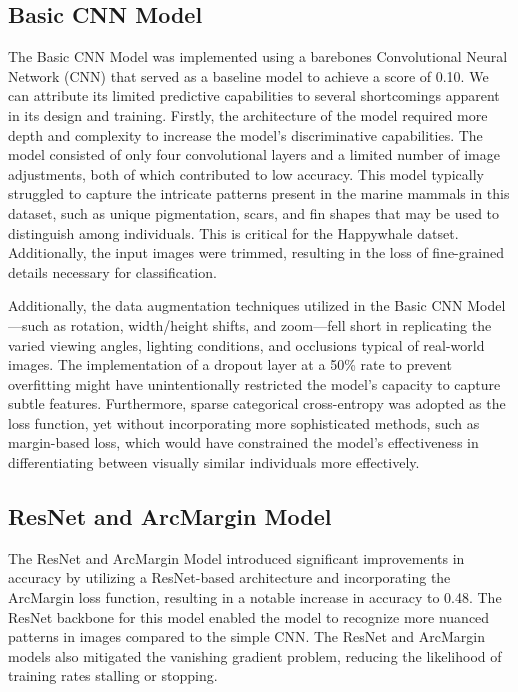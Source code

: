 \documentclass[twocolumn]{article}
\begin{document}
\subsection{Basic CNN Model}

The Basic CNN Model was implemented using a barebones Convolutional Neural Network (CNN) that served as a baseline model to achieve a score of 0.10. We can attribute its limited predictive capabilities to several shortcomings apparent in its design and training. Firstly, the architecture of the model required more depth and complexity to increase the model’s discriminative capabilities. The model consisted of only four convolutional layers and a limited number of image adjustments, both of which contributed to low accuracy. This model typically struggled to capture the intricate patterns present in the marine mammals in this dataset, such as unique pigmentation, scars, and fin shapes that may be used to distinguish among individuals. This is critical for the Happywhale datset. Additionally, the input images were trimmed, resulting in the loss of fine-grained details necessary for classification. 

Additionally, the data augmentation techniques utilized in the Basic CNN Model—such as rotation, width/height shifts, and zoom—fell short in replicating the varied viewing angles, lighting conditions, and occlusions typical of real-world images. The implementation of a dropout layer at a 50\% rate to prevent overfitting might have unintentionally restricted the model’s capacity to capture subtle features. Furthermore, sparse categorical cross-entropy was adopted as the loss function, yet without incorporating more sophisticated methods, such as margin-based loss, which would have constrained the model’s effectiveness in differentiating between visually similar individuals more effectively.

\subsection{ResNet and ArcMargin Model}

The ResNet and ArcMargin Model introduced significant improvements in accuracy by utilizing a ResNet-based architecture and incorporating the ArcMargin loss function, resulting in a notable increase in accuracy to 0.48. The ResNet backbone for this model enabled the model to recognize more nuanced patterns in images compared to the simple CNN. The ResNet and ArcMargin models also mitigated the vanishing gradient problem, reducing the likelihood of training rates stalling or stopping.
\end{document}
